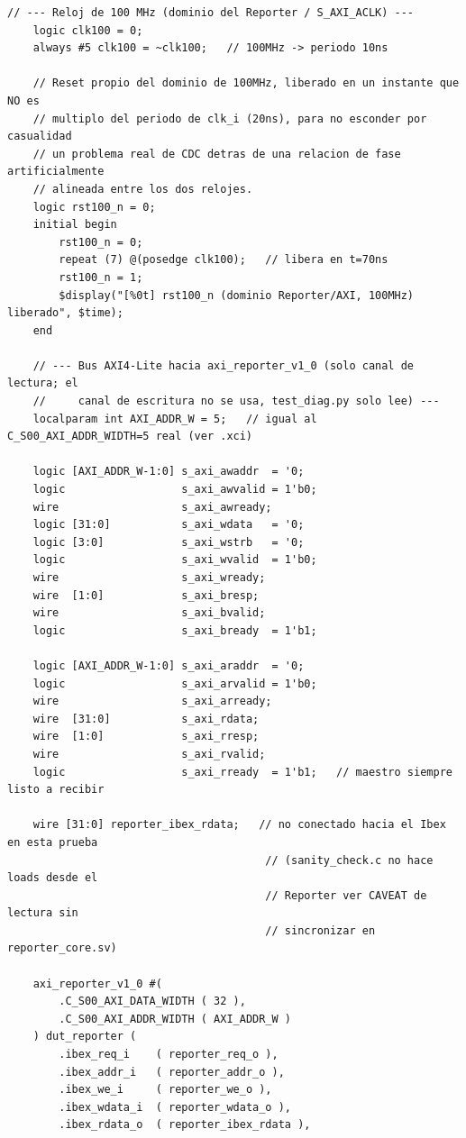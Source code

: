 \begin{lstlisting}[style=verilogstyle, basicstyle=\ttfamily\footnotesize, caption={Código fuente del subsistema \texttt{tb\_ibex\_bram\_subsystem.sv}}, label={code:tb_ibex_bram_subsystem.sv}]
    // --- Reloj de 100 MHz (dominio del Reporter / S_AXI_ACLK) ---
    logic clk100 = 0;
    always #5 clk100 = ~clk100;   // 100MHz -> periodo 10ns

    // Reset propio del dominio de 100MHz, liberado en un instante que NO es
    // multiplo del periodo de clk_i (20ns), para no esconder por casualidad
    // un problema real de CDC detras de una relacion de fase artificialmente
    // alineada entre los dos relojes.
    logic rst100_n = 0;
    initial begin
        rst100_n = 0;
        repeat (7) @(posedge clk100);   // libera en t=70ns
        rst100_n = 1;
        $display("[%0t] rst100_n (dominio Reporter/AXI, 100MHz) liberado", $time);
    end

    // --- Bus AXI4-Lite hacia axi_reporter_v1_0 (solo canal de lectura; el
    //     canal de escritura no se usa, test_diag.py solo lee) ---
    localparam int AXI_ADDR_W = 5;   // igual al C_S00_AXI_ADDR_WIDTH=5 real (ver .xci)

    logic [AXI_ADDR_W-1:0] s_axi_awaddr  = '0;
    logic                  s_axi_awvalid = 1'b0;
    wire                   s_axi_awready;
    logic [31:0]           s_axi_wdata   = '0;
    logic [3:0]            s_axi_wstrb   = '0;
    logic                  s_axi_wvalid  = 1'b0;
    wire                   s_axi_wready;
    wire  [1:0]            s_axi_bresp;
    wire                   s_axi_bvalid;
    logic                  s_axi_bready  = 1'b1;

    logic [AXI_ADDR_W-1:0] s_axi_araddr  = '0;
    logic                  s_axi_arvalid = 1'b0;
    wire                   s_axi_arready;
    wire  [31:0]           s_axi_rdata;
    wire  [1:0]            s_axi_rresp;
    wire                   s_axi_rvalid;
    logic                  s_axi_rready  = 1'b1;   // maestro siempre listo a recibir

    wire [31:0] reporter_ibex_rdata;   // no conectado hacia el Ibex en esta prueba
                                        // (sanity_check.c no hace loads desde el
                                        // Reporter ver CAVEAT de lectura sin
                                        // sincronizar en reporter_core.sv)

    axi_reporter_v1_0 #(
        .C_S00_AXI_DATA_WIDTH ( 32 ),
        .C_S00_AXI_ADDR_WIDTH ( AXI_ADDR_W )
    ) dut_reporter (
        .ibex_req_i    ( reporter_req_o ),
        .ibex_addr_i   ( reporter_addr_o ),
        .ibex_we_i     ( reporter_we_o ),
        .ibex_wdata_i  ( reporter_wdata_o ),
        .ibex_rdata_o  ( reporter_ibex_rdata ),


\end{lstlisting}

